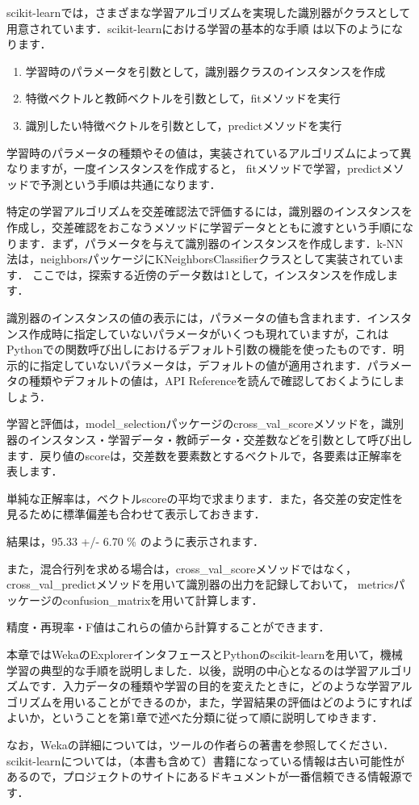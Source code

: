 scikit-learnでは，さまざまな学習アルゴリズムを実現した識別器がクラスとして用意されています．scikit-learnにおける学習の基本的な手順
は以下のようになります．
\begin{enumerate}
\item 学習時のパラメータを引数として，識別器クラスのインスタンスを作成
\item 特徴ベクトルと教師ベクトルを引数として，fitメソッドを実行
\item 識別したい特徴ベクトルを引数として，predictメソッドを実行
\end{enumerate}

学習時のパラメータの種類やその値は，実装されているアルゴリズムによって異なりますが，一度インスタンスを作成すると，
fitメソッドで学習，predictメソッドで予測という手順は共通になります．

特定の学習アルゴリズムを交差確認法で評価するには，識別器のインスタンスを作成し，交差確認をおこなうメソッドに学習データとともに渡すという手順になります．まず，パラメータを与えて識別器のインスタンスを作成します．k-NN法は，neighborsパッケージにKNeighborsClassifierクラスとして実装されています．
ここでは，探索する近傍のデータ数は1として，インスタンスを作成します．

識別器のインスタンスの値の表示には，パラメータの値も含まれます．インスタンス作成時に指定していないパラメータがいくつも現れていますが，これはPythonでの関数呼び出しにおけるデフォルト引数の機能を使ったものです．明示的に指定していないパラメータは，デフォルトの値が適用されます．パラメータの種類やデフォルトの値は，API Referenceを読んで確認しておくようにしましょう．

学習と評価は，model\_selectionパッケージのcross\_val\_scoreメソッドを，識別器のインスタンス・学習データ・教師データ・交差数などを引数として呼び出します．戻り値のscoreは，交差数を要素数とするベクトルで，各要素は正解率を表します．

単純な正解率は，ベクトルscoreの平均で求まります．また，各交差の安定性を見るために標準偏差も合わせて表示しておきます．

結果は，95.33 +/- 6.70 \% のように表示されます．

また，混合行列を求める場合は，cross\_val\_scoreメソッドではなく，cross\_val\_predictメソッドを用いて識別器の出力を記録しておいて，
metricsパッケージのconfusion\_matrixを用いて計算します．


精度・再現率・F値はこれらの値から計算することができます．


本章ではWekaのExplorerインタフェースとPythonのscikit-learnを用いて，機械学習の典型的な手順を説明しました．以後，説明の中心となるのは学習アルゴリズムです．入力データの種類や学習の目的を変えたときに，どのような学習アルゴリズムを用いることができるのか，また，学習結果の評価はどのようにすればよいか，ということを第1章で述べた分類に従って順に説明してゆきます．

なお，Wekaの詳細については，ツールの作者らの著書\cite{witten11}を参照してください．scikit-learnについては，（本書も含めて）書籍になっている情報は古い可能性があるので，プロジェクトのサイトにあるドキュメントが一番信頼できる情報源です．
